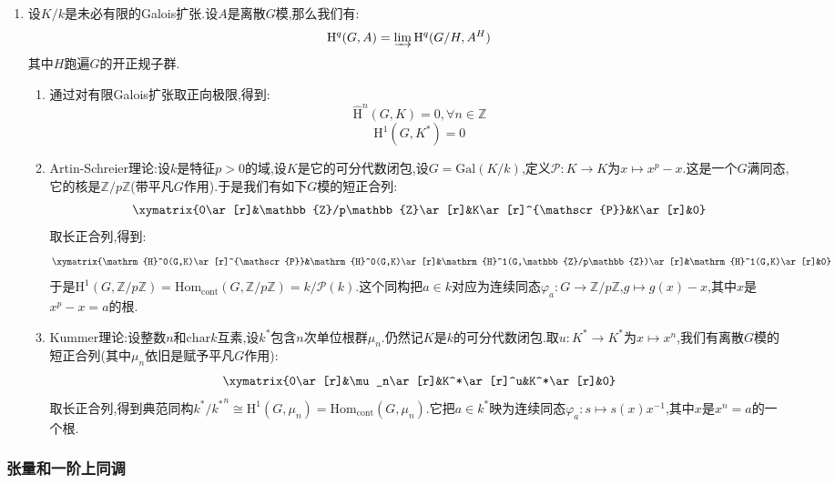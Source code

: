 \begin{enumerate}
\begin{enumerate}[(1)]
\begin{proof}
        	考虑如下短正合列:
        	$$\xymatrix{1\ar[r]&\mathrm{SL}(n,K)\ar[r]&\mathrm{GL}(n,K)\ar[r]^{\det}&K^*\ar[r]&1}$$
        	它诱导了如下长正合列:
        	$$\xymatrix{\mathrm{H}^0(G,\mathrm{GL}(n,K))\ar[r]&\mathrm{H}^0(G,K^*)\ar[r]&\mathrm{H}^1(G,\mathrm{SL}(n,K))\ar[r]&1}$$
        	但是第一个同态就是$\mathrm{GL}(n,k)\to k^*$,这是满射,于是$\mathrm{H}^1(G,\mathrm{SL}(n,K))=1$.
        \end{proof}
    \end{enumerate}
    \item 设$K/k$是未必有限的Galois扩张.设$A$是离散$G$模,那么我们有:
    $$\mathrm{H}^q(G,A)=\varinjlim\mathrm{H}^q(G/H,A^H)$$
    其中$H$跑遍$G$的开正规子群.
    \begin{enumerate}[(1)]
    	\item 通过对有限Galois扩张取正向极限,得到:
    	$$\widehat{\mathrm{H}}^n(G,K)=0,\forall n\in\mathbb{Z}$$
    	$$\mathrm{H}^1(G,K^*)=0$$
    	\item Artin-Schreier理论:设$k$是特征$p>0$的域,设$K$是它的可分代数闭包,设$G=\mathrm{Gal}(K/k)$,定义$\mathscr{P}:K\to K$为$x\mapsto x^p-x$.这是一个$G$满同态,它的核是$\mathbb{Z}/p\mathbb{Z}$(带平凡$G$作用).于是我们有如下$G$模的短正合列:
    	$$\xymatrix{0\ar[r]&\mathbb{Z}/p\mathbb{Z}\ar[r]&K\ar[r]^{\mathscr{P}}&K\ar[r]&0}$$
    	取长正合列,得到:
    	$$\xymatrix{\mathrm{H}^0(G,K)\ar[r]^{\mathscr{P}}&\mathrm{H}^0(G,K)\ar[r]&\mathrm{H}^1(G,\mathbb{Z}/p\mathbb{Z})\ar[r]&\mathrm{H}^1(G,K)\ar[r]&0}$$
    	于是$\mathrm{H}^1(G,\mathbb{Z}/p\mathbb{Z})=\mathrm{Hom}_{\mathrm{cont}}(G,\mathbb{Z}/p\mathbb{Z})=k/\mathscr{P}(k)$.这个同构把$a\in k$对应为连续同态$\varphi_a:G\to\mathbb{Z}/p\mathbb{Z}$,$g\mapsto g(x)-x$,其中$x$是$x^p-x=a$的根.
    	\item Kummer理论:设整数$n$和$\mathrm{char}k$互素,设$k^*$包含$n$次单位根群$\mu_n$.仍然记$K$是$k$的可分代数闭包.取$u:K^*\to K^*$为$x\mapsto x^n$,我们有离散$G$模的短正合列(其中$\mu_n$依旧是赋予平凡$G$作用):
    	$$\xymatrix{0\ar[r]&\mu_n\ar[r]&K^*\ar[r]^u&K^*\ar[r]&0}$$
    	取长正合列,得到典范同构$k^*/{k^*}^n\cong\mathrm{H}^1(G,\mu_n)=\mathrm{Hom}_{\mathrm{cont}}(G,\mu_n)$.它把$a\in k^*$映为连续同态$\varphi_a:s\mapsto s(x)x^{-1}$,其中$x$是$x^n=a$的一个根.
    \end{enumerate}
\end{enumerate}
\subsubsection{张量和一阶上同调}

